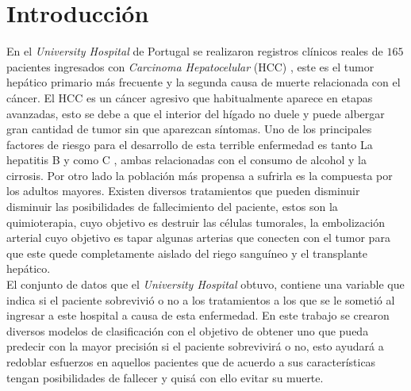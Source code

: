 \documentclass[6pt, twocolumn]{article}
\begin{document}
\section{Introducci\'on}
En el \textit{University Hospital} de Portugal se realizaron registros clínicos reales de $165$ pacientes ingresados con \textit{Carcinoma Hepatocelular} (HCC) \cite{dataset}, este es el tumor hepático primario más frecuente y la segunda causa de muerte relacionada con el cáncer. El HCC es un cáncer agresivo que habitualmente aparece en etapas avanzadas, esto se debe a que el interior del hígado no duele y puede albergar gran cantidad de tumor sin que aparezcan síntomas. Uno de los principales factores de riesgo para el desarrollo de esta terrible enfermedad es tanto La hepatitis B y como C \cite{HCC}, ambas relacionadas con el consumo de alcohol y la cirrosis. Por otro lado la población más propensa a sufrirla es la compuesta por los adultos mayores. Existen diversos tratamientos que pueden disminuir disminuir las posibilidades de fallecimiento del paciente, estos son  la quimioterapia, cuyo objetivo es destruir las células tumorales, la embolización arterial cuyo objetivo es tapar algunas arterias que conecten con el tumor para que este quede completamente aislado del riego sanguíneo y el transplante hepático. \\ 
El conjunto de datos que el \textit{University Hospital} obtuvo, contiene una variable que indica si el paciente sobrevivió  o no  a los tratamientos a los que se le sometió al ingresar a este hospital a causa de esta enfermedad. En este trabajo se crearon diversos modelos de clasificación con el objetivo de obtener uno que pueda predecir con la mayor precisión si el paciente sobrevivirá o no, esto ayudará a redoblar esfuerzos en aquellos pacientes que de acuerdo a sus características tengan posibilidades de fallecer y quisá con ello evitar su muerte. \\
\end{document}
